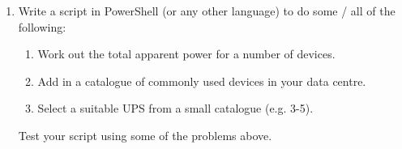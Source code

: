\documentclass{pgnotes}
\begin{document}
\begin{enumerate}
\item
  Write a script in PowerShell (or any other language) to do some / all of the following:
  \begin{enumerate}
  \item Work out the total apparent power for a number of devices.
  \item Add in a catalogue of commonly used devices in your data centre.
  \item Select a suitable UPS from a small catalogue (e.g. 3-5).
  \end{enumerate}
  Test your script using some of the problems above.
  
\end{enumerate}
  
\end{document}
